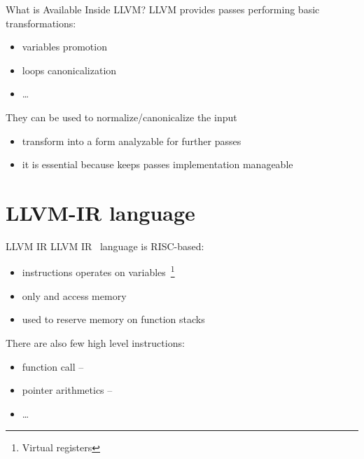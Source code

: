 \documentclass[10pt,mathserif]{beamer}
\begin{document}
\begin{frame}{What is Available Inside LLVM?}
LLVM provides passes performing basic transformations:

\begin{itemize}
\item variables promotion
\item loops canonicalization
\item \ldots
\end{itemize}

\vfill
They can be used to \alert{normalize/canonicalize} the input

\begin{itemize}
\item transform into a form analyzable for further passes
\item it is essential because keeps passes implementation manageable

\end{itemize}
\end{frame}

\section{LLVM-IR language}
\begin{frame}{LLVM IR}
LLVM IR~\cite{LOCAL:www/llvmLanguageRef} language is RISC-based:

\begin{itemize}
\item instructions operates on \alert{variables}~\footnote{Virtual registers}
\item only  and  access memory
\item {} used to reserve memory on function stacks
\end{itemize}
\vfill
There are also few \alert{high level instructions}:
\begin{itemize}
\item function call -- 
\item pointer arithmetics -- 
\item \ldots
\end{itemize}
\end{frame}
\end{document}
